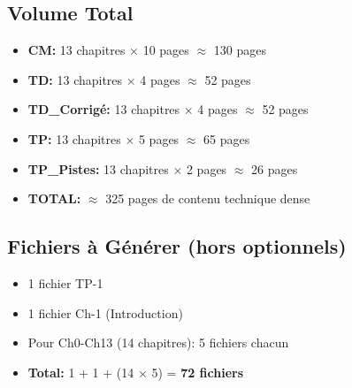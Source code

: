 \documentclass[10pt,a4paper]{article}
\begin{document}
\subsection*{Volume Total}

\begin{itemize}
\item \textbf{CM:} 13 chapitres × 10 pages $\approx$ 130 pages
\item \textbf{TD:} 13 chapitres × 4 pages $\approx$ 52 pages
\item \textbf{TD\_Corrigé:} 13 chapitres × 4 pages $\approx$ 52 pages
\item \textbf{TP:} 13 chapitres × 5 pages $\approx$ 65 pages
\item \textbf{TP\_Pistes:} 13 chapitres × 2 pages $\approx$ 26 pages
\item \textbf{TOTAL:} $\approx$ 325 pages de contenu technique dense
\end{itemize}

\subsection*{Fichiers à Générer (hors optionnels)}

\begin{itemize}
\item 1 fichier TP-1
\item 1 fichier Ch-1 (Introduction)
\item Pour Ch0-Ch13 (14 chapitres): 5 fichiers chacun
\item \textbf{Total:} 1 + 1 + (14 × 5) = \textbf{72 fichiers}
\end{itemize}
\end{document}
